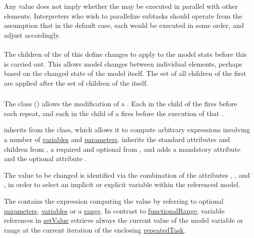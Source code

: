 Any  value does not imply whether the \SubTask may be executed in parallel with other \SubTask elements.  Interpreters who wish to parallelize subtasks should operate from the assumption that in the default case, each \SubTask would be executed in some order, and adjust accordingly.

\paragraph*{}
\label{sec:subTaskListOfChanges}
The \SetValue children of the \ListOfChanges of this \SubTask define changes to apply to the model state  before this \SubTask is carried out.  This allows model changes between individual \SubTask elements, perhaps based on the changed state of the model itself.  The set of all \SetValue children of the first \SubTask are applied after the set of \SetValue children of the \RepeatedTask itself.


\subsubsection{}
\label{class:setValue}
The  class () allows the modification of a \Model.  Each \SetValue in the \ListOfChanges child of the \RepeatedTask fires before each repeat, and each \SetValue in the \ListOfChanges child of a \SubTask fires before the execution of that \SubTask.

 inherits from the \ComputeChange class, which allows it to compute arbitrary expressions involving a number of \hyperref[class:variable]{variables} and \hyperref[class:parameter]{parameters}.  inherits the standard attributes and children from \SedBase, a required  and optional  from \ComputeChange, and adds a mandatory  attribute and the optional attribute .

The value to be changed is identified via the combination of the attributes , , and , in order to select an implicit or explicit variable within the referenced model.

The \Math contains the expression computing the value by referring to optional \hyperref[class:parameter]{parameters}, \hyperref[class:variable]{variables} or a \hyperref[class:range]{range}.
In contrast to \hyperref[class:functionalRange]{functionalRange}, variable references in \hyperref[class:setValue]{setValue} retrieve always the current value of the model variable or range at the current iteration of the enclosing \hyperref[class:repeatedTask]{repeatedTask}.

